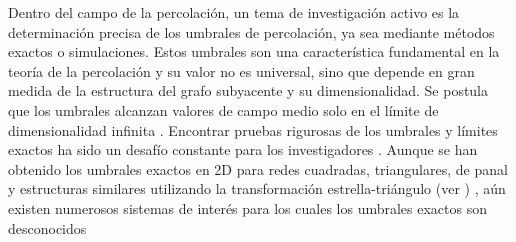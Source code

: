 Dentro del campo de la percolación, un tema de investigación activo es la determinación precisa de los umbrales de percolación, ya sea mediante métodos exactos o simulaciones. Estos umbrales son una característica fundamental en la teoría de la percolación y su valor no es universal, sino que depende en gran medida de la estructura del grafo subyacente y su dimensionalidad. Se postula que los umbrales alcanzan valores de campo medio solo en el límite de dimensionalidad infinita \cite{Artem,fisher_clúster_2004}. Encontrar pruebas rigurosas de los umbrales y límites exactos ha sido un desafío constante para los investigadores \cite{kesten_critical_1980,wierman_bond_1984,grimmett_percolation_2013}. Aunque se han obtenido los umbrales exactos en 2D para redes cuadradas, triangulares, de panal y estructuras similares utilizando la transformación estrella-triángulo (ver ) \cite{wierman_bond_1984}, aún existen numerosos sistemas de interés para los cuales los umbrales exactos son desconocidos

